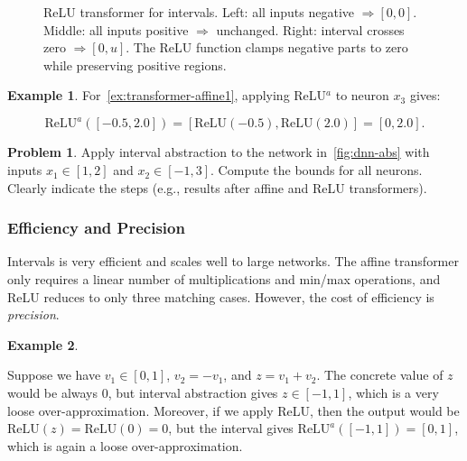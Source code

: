 \documentclass[oneside,11pt,dvipsnames]{book}
\numberwithin{equation}{section}
\theoremstyle{definition}
\newtheorem{example}{Example}[section]
\newtheorem{problem}{Problem}[section]
\theoremstyle{remark}
\newcommand{\myrelu}{\mathrm{ReLU}}
\begin{document}
\begin{figure}
\caption{
ReLU transformer for intervals.
Left: all inputs negative $\Rightarrow [0,0]$.
Middle: all inputs positive $\Rightarrow$ unchanged.
Right: interval crosses zero $\Rightarrow [0,u]$.
The ReLU function clamps negative parts to zero while preserving positive regions.
}
\label{fig:relu-interval-cases}
\end{figure}


\begin{example}
For~\autoref{ex:transformer-affine1}, applying ReLU$^a$ to neuron $x_3$ gives:

\[
\myrelu^a([-0.5, 2.0]) = [\myrelu(-0.5), \myrelu(2.0)]
= [0, 2.0].
\]
\end{example}

\begin{problem}\label{prob:int-abs}
  Apply interval abstraction to the network in~\autoref{fig:dnn-abs} with inputs \(x_1 \in [1, 2]\) and \(x_2 \in [-1, 3]\). Compute the bounds for all neurons.  Clearly indicate the steps (e.g., results after affine and ReLU transformers).
\end{problem}

\subsubsection{Efficiency and Precision}
Intervals is very efficient and scales  well to large networks. The affine transformer only requires a linear number of multiplications and min/max operations, and ReLU reduces to only three matching cases.
However, the cost of efficiency is \emph{precision}.

\begin{example}\label{ex:interval-overapproximation}

Suppose we have $v_1 \in [0, 1]$, $v_2 = -v_1$, and $z = v_1 + v_2$.
The concrete value of $z$ would be always 0, but interval abstraction gives $z \in [-1, 1]$, which is a very loose over-approximation.
Moreover, if we apply ReLU, then the output would be $\myrelu(z) = \myrelu(0) = 0$, but the interval gives $\myrelu^a([-1, 1]) = [0, 1]$, which is again a loose over-approximation.
\end{example}
\end{document}
